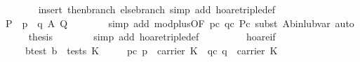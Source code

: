 \begin{isabellebody}
\ \ \ \ \ \ \isamarkupfalse%
\ {}insert\ then{}branch\ else{}branch{}\ {}simp\ add{}\ hoare{}triple{}def{}{}\isanewline
\ \ \ \ \isamarkupfalse%
\ {}P\ {}\ {}p\ {}\ q{}\ {}\isactrlbsub A\isactrlesub \ Q{}\isanewline
\ \ \ \ \ \ \isamarkupfalse%
\ {}simp\ add{}\ mod{}plus{}OF\ pc\ qc\ Pc{}{}\ subst\ A{}bin{}lub{}var{}\ auto{}\isanewline
\ \ \ \ \isamarkupfalse%
\ {}thesis\isanewline
\ \ \ \ \ \ \isamarkupfalse%
\ {}simp\ add{}\ hoare{}triple{}def{}\isanewline
\ \ \isamarkupfalse%
%
\endisatagproof
{\isafoldproof}%
%
\isadelimproof
\isanewline
%
\endisadelimproof
\isanewline
\ \ \isanewline
\isanewline
\ \ \isamarkupfalse%
\ hoare{}if{}\isanewline
\ \ \ \ \ b{}test{}\ {}b\ {}\ tests\ K{}\isanewline
\ \ \ \ \ pc{}\ {}p\ {}\ carrier\ K{}\ \ qc{}\ {}q\ {}\ carrier\ K{}\isanewline

\end{isabellebody}
